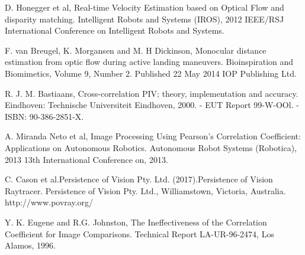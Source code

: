 \documentclass[letterpaper, 10 pt,conference]{ieeeconf}  %
\begin{document}
\begin{thebibliography}{99}

         D. Honegger et al, Real-time Velocity Estimation based on Optical Flow and disparity matching.
         Intelligent Robots and Systems (IROS), 2012 IEEE/RSJ International Conference on Intelligent Robots and Systems.
        
         F. van Breugel, K. Morgansen and M. H Dickinson, Monocular distance estimation from optic flow during
        active landing maneuvers. Bioinspiration and Biomimetics, Volume 9, Number 2. Published 22 May 2014 IOP Publishing Ltd.


	 R. J. M. Bastiaans, Cross-correlation PIV; theory, implementation and accuracy. 
        Eindhoven: Technische Universiteit Eindhoven, 2000. - EUT Report 99-W-OOl. - ISBN: 90-386-2851-X.

         A. Miranda Neto et al, Image Processing Using Pearson's Correlation Coefficient: 
        Applications on Autonomous Robotics. 
        Autonomous Robot Systems (Robotica), 2013 13th International Conference on, 2013.
        
          C. Cason et al.Persistence of Vision Pty. Ltd. (2017).Persistence of Vision Raytracer.
	Persistence of Vision Pty. Ltd., Williamstown, Victoria, Australia. http://www.povray.org/
	
	 Y. K. Eugene and R.G. Johnston, The Ineffectiveness of the Correlation Coefficient for Image Comparisons.
        Technical Report LA-UR-96-2474, Los Alamos, 1996.
	
	
        

	

        
        
	
\end{thebibliography}
\end{document}
